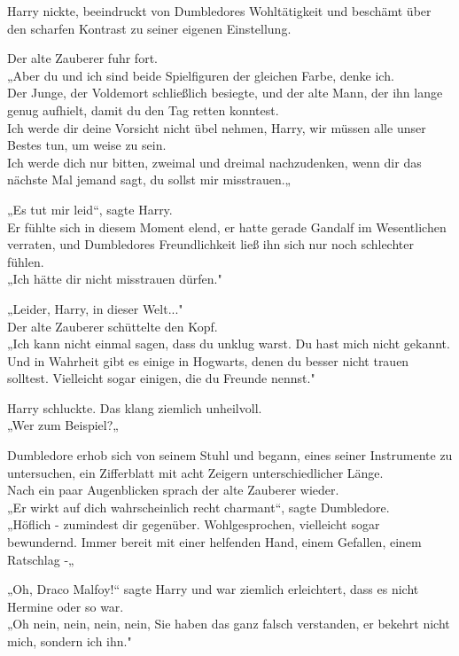 {Harry nickte, beeindruckt von Dumbledores Wohltätigkeit und beschämt über den scharfen Kontrast zu seiner eigenen Einstellung.

Der alte Zauberer fuhr fort.\\ „Aber du und ich sind beide Spielfiguren der gleichen Farbe, denke ich.\\ Der Junge, der Voldemort schließlich besiegte, und der alte Mann, der ihn lange genug aufhielt, damit du den Tag retten konntest.\\ Ich werde dir deine Vorsicht nicht übel nehmen, Harry, wir müssen alle unser Bestes tun, um weise zu sein.\\ Ich werde dich nur bitten, zweimal und dreimal nachzudenken, wenn dir das nächste Mal jemand sagt, du sollst mir misstrauen.„

„Es tut mir leid“, sagte Harry.\\ Er fühlte sich in diesem Moment elend, er hatte gerade Gandalf im Wesentlichen verraten, und Dumbledores Freundlichkeit ließ ihn sich nur noch schlechter fühlen.\\ „Ich hätte dir nicht misstrauen dürfen."

„Leider, Harry, in dieser Welt..."\\ Der alte Zauberer schüttelte den Kopf.\\ „Ich kann nicht einmal sagen, dass du unklug warst. Du hast mich nicht gekannt. Und in Wahrheit gibt es einige in Hogwarts, denen du besser nicht trauen solltest. Vielleicht sogar einigen, die du Freunde nennst."

Harry schluckte. Das klang ziemlich unheilvoll.\\ „Wer zum Beispiel?„

Dumbledore erhob sich von seinem Stuhl und begann, eines seiner Instrumente zu untersuchen, ein Zifferblatt mit acht Zeigern unterschiedlicher Länge.\\ Nach ein paar Augenblicken sprach der alte Zauberer wieder.\\ „Er wirkt auf dich wahrscheinlich recht charmant“, sagte Dumbledore.\\ „Höflich - zumindest dir gegenüber. Wohlgesprochen, vielleicht sogar bewundernd. Immer bereit mit einer helfenden Hand, einem Gefallen, einem Ratschlag -„

„Oh, Draco Malfoy!“ sagte Harry und war ziemlich erleichtert, dass es nicht Hermine oder so war.\\ „Oh nein, nein, nein, nein, Sie haben das ganz falsch verstanden, er bekehrt nicht mich, sondern ich ihn."

}
